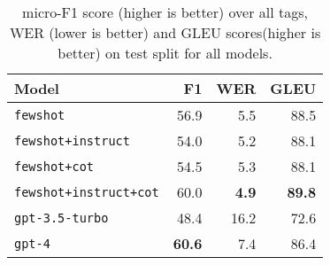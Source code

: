 \begin{table}[t]
    \centering
    \begin{tabular}{lrrr}
        \toprule
        \textbf{Model} & \textbf{F1} & \textbf{WER} & \textbf{GLEU} \\ \midrule
        \texttt{fewshot} & 56.9 & 5.5 & 88.5  \\ \midrule
        \texttt{fewshot+instruct} & 54.0 & 5.2 & 88.1  \\ \midrule
        \texttt{fewshot+cot} & 54.5 & 5.3 &  88.1  \\ \midrule
        \texttt{fewshot+instruct+cot} & 60.0 & \textbf{4.9} & \textbf{89.8}  \\ \midrule
        \texttt{gpt-3.5-turbo} & 48.4 & 16.2 & 72.6  \\ \midrule
        \texttt{gpt-4} & \textbf{60.6} & 7.4 & 86.4  \\ \bottomrule
    \end{tabular}
    \caption{micro-F1 score (higher is better) over all tags, WER (lower is better) and GLEU scores(higher is better) on test split for all models.}
    \label{tab:results-football}
\end{table}
